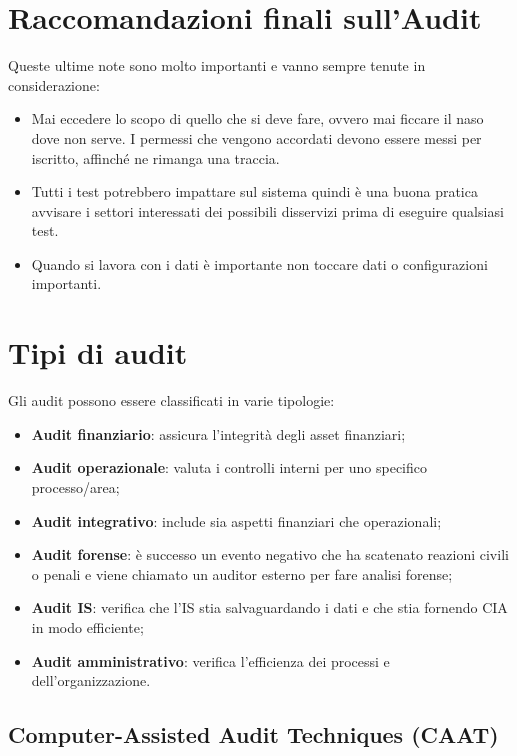 \section{Raccomandazioni finali sull'Audit}

Queste ultime note sono molto importanti e vanno sempre tenute in
considerazione:
\begin{itemize}
\item Mai eccedere lo scopo di quello che si deve fare, ovvero mai ficcare il
naso dove non serve. I permessi che vengono accordati devono essere messi per
iscritto, affinché ne rimanga una traccia.
\item Tutti i test potrebbero impattare sul sistema quindi è una buona
pratica avvisare i settori interessati dei possibili disservizi prima di eseguire
qualsiasi test.
\item Quando si lavora con i dati è importante non toccare dati o configurazioni
importanti.
\end{itemize}


\section{Tipi di audit}

Gli audit possono essere classificati in varie tipologie:
\begin{itemize}
\item \textbf{Audit finanziario}: assicura l'integrità degli asset
finanziari;
\item \textbf{Audit operazionale}: valuta i controlli interni per uno
specifico processo/area;
\item \textbf{Audit integrativo}: include sia aspetti finanziari
che operazionali;
\item \textbf{Audit forense}: è successo un evento negativo che ha
scatenato reazioni civili o penali e viene chiamato un auditor
esterno per fare analisi forense;
\item \textbf{Audit IS}: verifica che l'IS stia salvaguardando i dati
e che stia fornendo CIA in modo efficiente;
\item \textbf{Audit amministrativo}: verifica l'efficienza dei processi
e dell'organizzazione.
\end{itemize}


\subsection{Computer-Assisted Audit Techniques (CAAT)}

